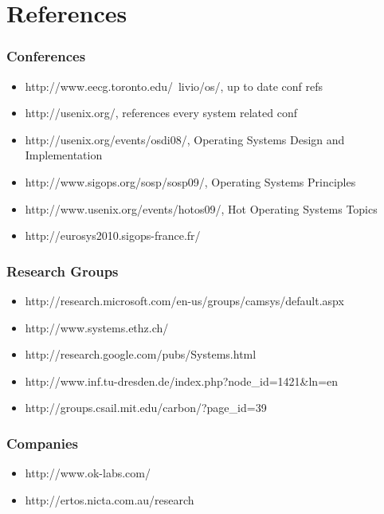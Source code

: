 %
%

\section{References}


\begin{frame}
  \frametitle{Conferences}
  \begin{itemize}
    \item http://www.eecg.toronto.edu/~livio/os/, up to date conf refs
    \item http://usenix.org/, references every system related conf
    \item http://usenix.org/events/osdi08/, Operating Systems Design and Implementation
    \item http://www.sigops.org/sosp/sosp09/, Operating Systems Principles
    \item http://www.usenix.org/events/hotos09/, Hot Operating Systems Topics
    \item http://eurosys2010.sigops-france.fr/
  \end{itemize}
\end{frame}


\begin{frame}
  \frametitle{Research Groups}
  \begin{itemize}
    \item http://research.microsoft.com/en-us/groups/camsys/default.aspx
    \item http://www.systems.ethz.ch/
    \item http://research.google.com/pubs/Systems.html
    \item http://www.inf.tu-dresden.de/index.php?node\_id=1421\&ln=en
    \item http://groups.csail.mit.edu/carbon/?page\_id=39
  \end{itemize}
\end{frame}


\begin{frame}
  \frametitle{Companies}
  \begin{itemize}
    \item http://www.ok-labs.com/
    \item http://ertos.nicta.com.au/research
  \end{itemize}
\end{frame}



